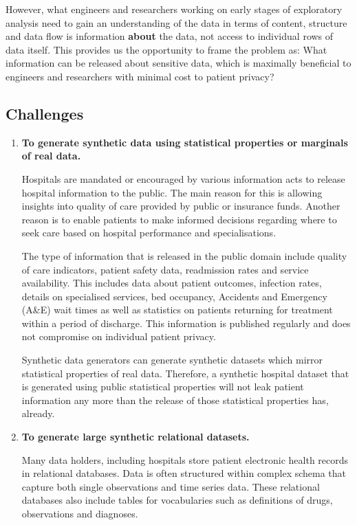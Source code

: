 \documentclass[11pt]{article}
\begin{document}
However, what engineers and researchers working on early stages of exploratory analysis need to gain an understanding of the data in terms of content, structure and data flow is information \textbf{about} the data, not access to individual rows of data itself. This provides us the opportunity to frame the problem as: What information can be released about sensitive data, which is maximally beneficial to engineers and researchers with minimal cost to patient privacy?

\subsection{Challenges}

\begin{enumerate}[leftmargin=*]
    \item \textbf{To generate synthetic data using statistical properties or marginals of real data.
    }
    
    Hospitals are mandated or encouraged by various information acts to release hospital information to the public. The main reason for this is allowing insights into quality of care provided by public or insurance funds. Another reason is to enable patients to make informed decisions regarding where to seek care based on hospital performance and specialisations. 

    The type of information that is released in the public domain include quality of care indicators, patient safety data, readmission rates and service availability. This includes data about patient outcomes, infection rates, details on specialised services, bed occupancy, Accidents and Emergency (A\&E) wait times as well as statistics on patients returning for treatment within a period of discharge. This information is published regularly and does not compromise on individual patient privacy.  

    Synthetic data generators can generate synthetic datasets which mirror statistical properties of real data. Therefore, a synthetic hospital dataset that is generated using public statistical properties will not leak patient information any more than the release of those statistical properties has, already. 

    \item \textbf{To generate large synthetic relational datasets.
    }
    
    Many data holders, including hospitals store patient electronic health records in relational databases. Data is often structured within complex schema that capture both single observations and time series data. These relational databases also include tables for vocabularies such as definitions of drugs, observations and diagnoses. 


\end{enumerate}
\end{document}
